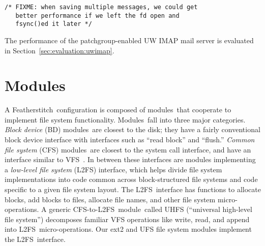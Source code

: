 \documentclass[9pt,twocolumn,letterpaper]{article}
\newcommand{\Kudos}{Featherstitch}
\newcommand{\module}{module}
\newcommand{\modules}{modules}
\newcommand{\Modules}{Modules}
\newcommand{\patchgroup}{patchgroup}
\newcommand{\LFS}{L2FS}
\begin{document}
\vspace{-0.5\baselineskip}
\begin{scriptsize}
\begin{verbatim}
/* FIXME: when saving multiple messages, we could get
   better performance if we left the fd open and
   fsync()ed it later */
\end{verbatim}
\end{scriptsize}
\vspace{-0.5\baselineskip}

The performance of the \patchgroup{}-enabled UW IMAP mail server is
evaluated in Section~\ref{sec:evaluation:uwimap}.


\section{\Modules}
\label{sec:modules}

A \Kudos\ configuration is composed of \modules\ that cooperate to
 implement file system functionality.
%
\Modules\ fall into three major categories.
%
\emph{Block device} (BD) \modules\ are closest to the disk; they have a fairly
conventional block device interface with interfaces such as ``read block'' and
``flush.''
%
\emph{Common file system} (CFS) \modules\ are closest to the system call
interface, and have an interface similar to VFS~\cite{kleiman86vnodes}. 
%
In between these interfaces are modules implementing a  \emph{low-level file
system} (\LFS) interface, which helps divide file system implementations
into code common across block-structured file systems and code specific to
a given file system layout.
%
The \LFS\ interface has functions to allocate blocks, add blocks to files,
allocate file names, and other file system micro-operations. 
A generic CFS-to-\LFS\ \module\ called UHFS
(``universal high-level file system'') decomposes familiar VFS operations
like write, read, and append into \LFS\ micro-operations. 
%
%
Our ext2 and UFS file system modules
implement the \LFS\ interface.
\end{document}
